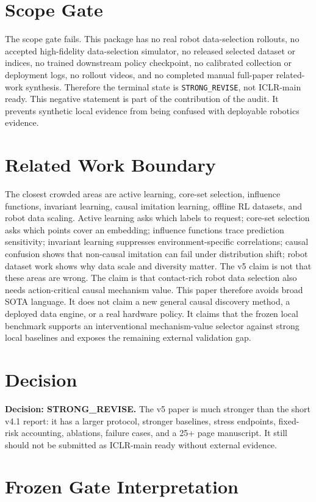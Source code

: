 \documentclass{article}
\begin{document}
\section{Scope Gate}
The scope gate fails. This package has no real robot data-selection rollouts, no accepted high-fidelity data-selection simulator, no released selected dataset or indices, no trained downstream policy checkpoint, no calibrated collection or deployment logs, no rollout videos, and no completed manual full-paper related-work synthesis. Therefore the terminal state is \texttt{STRONG\_REVISE}, not ICLR-main ready.
This negative statement is part of the contribution of the audit. It prevents synthetic local evidence from being confused with deployable robotics evidence.
\section{Related Work Boundary}
The closest crowded areas are active learning, core-set selection, influence functions, invariant learning, causal imitation learning, offline RL datasets, and robot data scaling. Active learning asks which labels to request; core-set selection asks which points cover an embedding; influence functions trace prediction sensitivity; invariant learning suppresses environment-specific correlations; causal confusion shows that non-causal imitation can fail under distribution shift; robot dataset work shows why data scale and diversity matter. The v5 claim is not that these areas are wrong. The claim is that contact-rich robot data selection also needs action-critical causal mechanism value.
This paper therefore avoids broad SOTA language. It does not claim a new general causal discovery method, a deployed data engine, or a real hardware policy. It claims that the frozen local benchmark supports an interventional mechanism-value selector against strong local baselines and exposes the remaining external validation gap.
\section{Decision}
\textbf{Decision: STRONG\_REVISE.} The v5 paper is much stronger than the short v4.1 report: it has a larger protocol, stronger baselines, stress endpoints, fixed-risk accounting, ablations, failure cases, and a 25+ page manuscript. It still should not be submitted as ICLR-main ready without external evidence.
\clearpage
\appendix
\section{Frozen Gate Interpretation}
\end{document}
